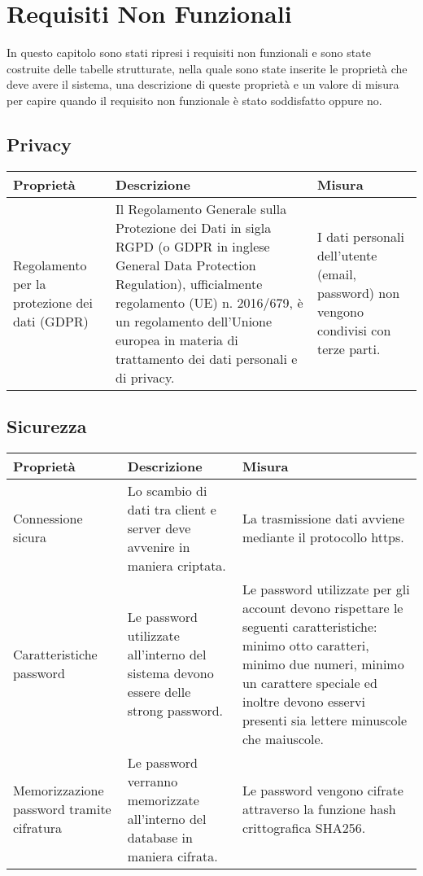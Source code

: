 \section{Requisiti Non Funzionali}
In questo capitolo sono stati ripresi i requisiti non funzionali e sono state costruite delle tabelle strutturate, nella quale sono state inserite le proprietà che deve avere il sistema, una descrizione di queste proprietà e un valore di misura per capire quando il requisito non funzionale è stato soddisfatto oppure no.

\subsection{Privacy}
\begin{tabularx}{\textwidth}{ |X |X| X|}
    \hline
    \textbf{Proprietà} & \textbf{Descrizione} & \textbf{Misura} \\
    \hline
    Regolamento per la protezione dei dati (GDPR) & Il Regolamento Generale sulla Protezione dei Dati in sigla RGPD (o GDPR in inglese General Data Protection Regulation), ufficialmente regolamento (UE) n. 2016/679, è un regolamento dell'Unione europea in materia di trattamento dei dati personali e di privacy. & I dati personali dell’utente (email, password) non vengono condivisi con terze parti.\\
    \hline
\end{tabularx}

\subsection{Sicurezza}
\begin{tabularx}{\textwidth}{ |X |X| X|}
    \hline
    \textbf{Proprietà} & \textbf{Descrizione} & \textbf{Misura} \\
    \hline
    Connessione sicura & Lo scambio di dati tra client e server deve avvenire in maniera criptata. & La trasmissione dati avviene mediante il protocollo https. \\
    \hline
    Caratteristiche password & Le password utilizzate all’interno del sistema devono essere delle strong password. & Le password utilizzate per gli account devono rispettare le seguenti caratteristiche: minimo otto caratteri, minimo due numeri, minimo un carattere speciale ed inoltre devono esservi presenti sia lettere minuscole che maiuscole. \\
    \hline
    Memorizzazione password tramite cifratura & Le password verranno memorizzate all’interno del database in maniera cifrata. & Le password vengono cifrate attraverso la funzione hash crittografica SHA256. \\
    \hline
\end{tabularx}

